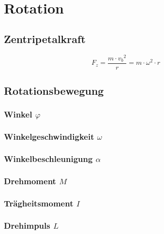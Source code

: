 



\chapter{Rotation}
\section{Zentripetalkraft}
\[ F_z = \frac{m \cdot {v_b}^2}{r} = m \cdot \omega^2 \cdot r \]

\section{Rotationsbewegung}

\subsection{Winkel $\varphi$}

\subsection{Winkelgeschwindigkeit $\omega$}

\subsection{Winkelbeschleunigung $\alpha$}

\subsection{Drehmoment $M$}

\subsection{Trägheitsmoment $I$}

\subsection{Drehimpuls $L$}